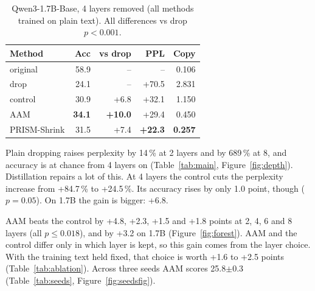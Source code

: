 \documentclass[11pt]{article}
\begin{document}
\begin{table}[t]
\centering\small
\begin{tabular}{lrrrr}
\toprule
Method & Acc & vs drop & PPL & Copy \\
\midrule
original & 58.9 & -- & -- & 0.106 \\
drop & 24.1 & -- & +70.5 & 2.831 \\
control & 30.9 & +6.8 & +32.1 & 1.150 \\
AAM & \textbf{34.1} & \textbf{+10.0} & +29.4 & 0.450 \\
PRISM-Shrink & 31.5 & +7.4 & \textbf{+22.3} & \textbf{0.257} \\
\bottomrule
\end{tabular}
\caption{Qwen3-1.7B-Base, 4 layers removed (all methods trained on plain text). All differences vs drop
$p<0.001$.}
\label{tab:17b}
\end{table}

\begin{table}[t]
\centering\small
{}
\caption{Three seeds, Qwen3-0.6B, 4 layers removed. $^{*}$significant on every seed ($p\le 0.009$). Mean mC4
perplexity increase: AAM +23.0\,\%, PRISM-Shrink +16.6\,\%, control +24.2\,\%.}
\label{tab:seeds}
\end{table}

Plain dropping raises perplexity by 14\,\% at 2 layers and by 689\,\% at 8, and accuracy is at chance from 4 layers
on (Table~\ref{tab:main}, Figure~\ref{fig:depth}). Distillation repairs a lot of this. At 4 layers the control cuts
the perplexity increase from +84.7\,\% to +24.5\,\%. Its accuracy rises by only 1.0 point, though ($p=0.05$). On
1.7B the gain is bigger: +6.8.

AAM beats the control by +4.8, +2.3, +1.5 and +1.8 points at 2, 4, 6 and 8 layers (all $p\le 0.018$), and by +3.2 on
1.7B (Figure~\ref{fig:forest}). AAM and the control differ only in which layer is kept, so this gain comes from the
layer choice. With the training text held fixed, that choice is worth +1.6 to +2.5 points (Table~\ref{tab:ablation}).
Across three seeds AAM scores 25.8$\pm$0.3 (Table~\ref{tab:seeds}, Figure~\ref{fig:seedsfig}).
\end{document}
